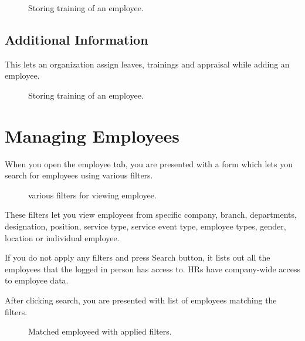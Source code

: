 \documentclass[letterpaper,10pt,english]{sphinxmanual}
\begin{document}
\begin{figure}[htbp]
\centering
\capstart

\noindent{}
\caption{Storing training of an employee.}\label{\detokenize{employee/add:id12}}\end{figure}


\subsection{Additional Information}
\label{\detokenize{employee/add:additional-information}}
This lets an organization assign leaves, trainings and appraisal while adding an employee.

\begin{figure}[htbp]
\centering
\capstart

\noindent{}
\caption{Storing training of an employee.}\label{\detokenize{employee/add:id13}}\end{figure}


\section{Managing Employees}
\label{\detokenize{employee/view::doc}}\label{\detokenize{employee/view:managing-employees}}
When you open the employee tab, you are presented with a form which lets you search for employees using various filters.

\begin{figure}[htbp]
\centering
\capstart

\noindent{}
\caption{various filters for viewing employee.}\label{\detokenize{employee/view:id1}}\end{figure}

These filters let you view employees from specific company, branch, departments, designation, position, service type, service event type, employee types, gender, location or individual employee.

If you do not apply any filters and press Search button, it lists out all the employees that the logged in person has access to. HRs have company-wide access to employee data.

After clicking search, you are presented with list of employees matching the filters.

\begin{figure}[htbp]
\centering
\capstart

\noindent{}
\caption{Matched employeed with applied filters.}\label{\detokenize{employee/view:id2}}\end{figure}
\end{document}
